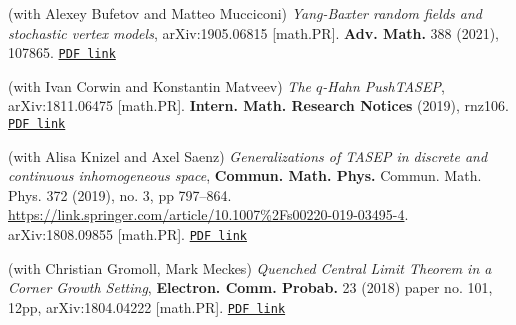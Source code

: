 \documentclass[letterpaper,11pt]{article}
\begin{document}
\begin{etaremune}
\item 
	(with Alexey Bufetov and Matteo Mucciconi)
	\emph{Yang-Baxter random fields and stochastic vertex models},
	arXiv:1905.06815 [math.PR].
	\textbf{Adv. Math.} 388 (2021), 107865.
	\href{https://storage.lpetrov.cc/research_files/Petrov-publ/31-publ-petrov-uva.pdf}{\texttt{PDF link}}	
\item 
	(with Ivan Corwin and Konstantin Matveev)
	\emph{The $q$-Hahn PushTASEP},
	arXiv:1811.06475 [math.PR].
	\textbf{Intern. Math. Research Notices} (2019), rnz106.
		\href{https://storage.lpetrov.cc/research_files/Petrov-publ/30-publ-petrov-uva.pdf}{\texttt{PDF link}}	
\item 
	(with Alisa Knizel and
		Axel Saenz)
		\emph{Generalizations of TASEP in discrete and continuous inhomogeneous space},
		\textbf{Commun. Math. Phys.} 
		Commun. Math. Phys. 
		372 (2019), no. 3, pp 797–864.
		\url{https://link.springer.com/article/10.1007%2Fs00220-019-03495-4}.
		arXiv:1808.09855 [math.PR].
		\href{https://storage.lpetrov.cc/research_files/Petrov-publ/29-publ-petrov-uva.pdf}{\texttt{PDF link}}
\item (with Christian Gromoll, Mark Meckes)
		\emph{Quenched Central Limit Theorem in a Corner Growth Setting},
		\textbf{Electron. Comm. Probab.} 23 (2018) paper no. 101, 12pp,
		arXiv:1804.04222 [math.PR]. 
		\href{https://storage.lpetrov.cc/research_files/Petrov-publ/28-publ-petrov-uva.pdf}{\texttt{PDF link}}
	

\end{etaremune}
\end{document}
